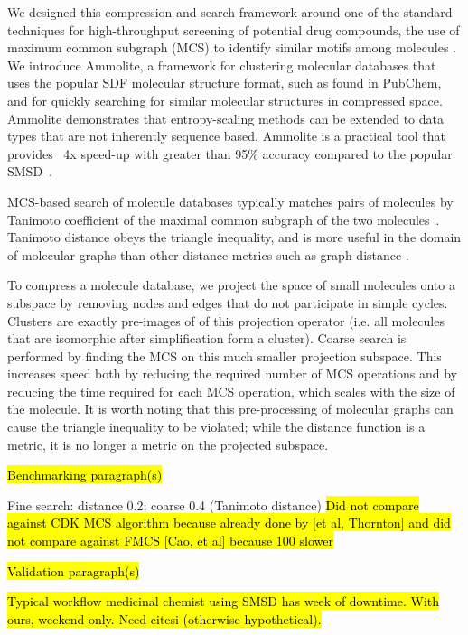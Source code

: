 \documentclass[review,preprint,12pt]{elsarticle}
\renewcommand{\cite}{\citep} %
\theoremstyle{definition}
\theoremstyle{remark}
\numberwithin{equation}{section}
\begin{document}
We designed this compression and search framework around one of the standard 
techniques for high-throughput screening of potential drug compounds, the use 
of maximum common subgraph (MCS) to identify similar motifs among molecules \cite{cao2008maximum, rahman2009small}.
We introduce Ammolite, a framework for clustering molecular databases that uses the 
popular SDF molecular structure format, such as found in PubChem, and for quickly searching for 
similar molecular structures in compressed space.
Ammolite demonstrates that entropy-scaling methods can be extended to data types that are not inherently sequence based.
Ammolite is a practical 
tool that provides ~4x speed-up with greater than 95\% accuracy compared to the popular SMSD~\cite{rahman2009small}.

MCS-based search of molecule databases typically matches pairs of molecules by 
Tanimoto coefficient of the maximal common subgraph of the two molecules~\cite{rahman2009small}. 
Tanimoto distance obeys the triangle inequality, and is more useful in the 
domain of molecular graphs than other
distance metrics such as graph distance \cite{bunke1998graph}.

To compress a molecule database, we project the space of small molecules onto a subspace by removing nodes and edges that do not participate in simple cycles.
Clusters are exactly pre-images of of this projection operator (i.e. all molecules that are isomorphic after simplification form a cluster).
Coarse search is performed by finding the MCS on this much smaller projection subspace. This increases speed both by reducing the required number of MCS operations 
and by reducing the time required for each MCS operation, which scales with the size of the molecule.
It is worth noting that this pre-processing of molecular graphs can cause the 
triangle inequality to be violated; while the distance function is a metric, it 
is no longer a metric on the projected subspace.

\hl{Benchmarking paragraph(s)}

Fine search: distance 0.2; coarse 0.4 (Tanimoto distance)
\hl{Did not compare against CDK MCS algorithm because already done by [et al, Thornton] and did not compare against FMCS [Cao, et al] because 100 slower}

\hl{Validation paragraph(s)}

\hl{Typical workflow medicinal chemist using SMSD has week of downtime. With ours, weekend only. Need citesi (otherwise hypothetical).}
\end{document}
